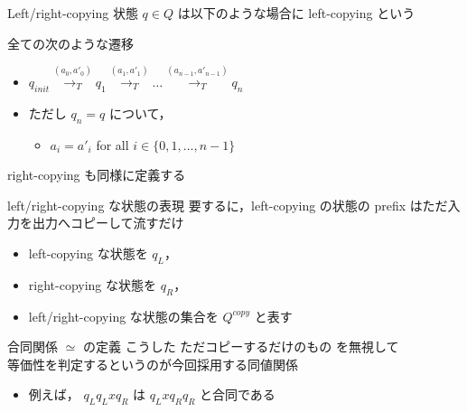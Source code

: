\documentclass[presentation, xetex]{beamer}
\begin{document}
\begin{frame}[label={sec:org2c0415e}]{Left/right-copying}
状態 \(q \in Q\) は以下のような場合に \alert{\alert{left-copying}} という

全ての次のような遷移
\begin{itemize}
\item \(q_{init} \overset{(a_0, a'_0)}{\longrightarrow_T} q_1 \overset{(a_1, a'_1)}{\longrightarrow_T} \dots \overset{(a_{n-1}, a'_{n-1})}{\longrightarrow_T} q_n\)
\item ただし \(q_n = q\)
について，
\begin{itemize}
\item \(a_i = a'_i\) for all \(i \in \{0, 1, \dots, n - 1\}\)
\end{itemize}
\end{itemize}


\hspace{1em}


right-copying も同様に定義する
\end{frame}

\begin{frame}[label={sec:orgbd617d3}]{left/right-copying な状態の表現}
要するに，left-copying の状態の prefix はただ入力を出力へコピーして流すだけ

\begin{itemize}
\item left-copying な状態を \(q_L\)，
\item right-copying な状態を \(q_R\)，
\item left/right-copying な状態の集合を \(Q^{copy}\)
と表す
\end{itemize}
\end{frame}


\begin{frame}[label={sec:org35ea663}]{合同関係 \(\simeq\) の定義}
こうした \alert{\alert{ただコピーするだけのもの}} を無視して\\
等価性を判定するというのが今回採用する同値関係
\begin{itemize}
\item 例えば，
\(q_L q_L x q_R\)
は
\(q_L x q_R q_R\)
と合同である
\end{itemize}
\end{frame}
\end{document}
